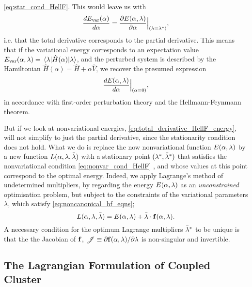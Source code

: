 \autoref{eq:stat_cond_HellF}. This would leave us with 
\begin{equation}
    \frac{d E_{\text{var}}(\alpha)}{d\alpha} 
    = \frac{\partial E(\alpha, \vb{\lambda})}{\partial\alpha}\Big\lvert_{(\vb{\lambda} = \vb{\lambda}^*)},
\end{equation}
i.e. that the total derivative corresponds to the partial derivative. This means that if the variational 
energy corresponds to an expectation value 
$E_{\text{var}}(\alpha, \vb{\lambda}) = \mel{\vb{\lambda}}{\hat{H}(\alpha)}{\vb{\lambda}}$, and the 
perturbed system is described by the Hamiltonian $\hat{H}(\alpha) = \hat{H} + \alpha\hat{V}$, we 
recover the presumed expression
\begin{equation}
\frac{dE(\alpha, \vb{\lambda})}{d\alpha}\Big\lvert_{(\alpha = 0)},
\end{equation}
in accordance with first-order perturbation theory and the Hellmann-Feynmann theorem.

But if we look at nonvariational energies, \autoref{eq:total_derivative_HellF_energy},
will not simplify to just the partial derivative, since the stationarity condition does not hold. 
What we do is replace the now nonvariational function $E(\alpha, \vb{\lambda})$ by a new function 
$L(\alpha, \vb{\lambda}, \bar{\vb{\lambda}})$ with a stationary point 
$(\vb{\lambda}^*, \bar{\vb{\lambda}}^*)$ that satisfies the nonvariational condition
\autoref{eq:nonvar_cond_HellF}
, and whose values at this point correspond to the optimal
energy. Indeed, we apply Lagrange's method of undetermined multipliers, by regarding the 
energy $E(\alpha, \vb{\lambda})$ as an \emph{unconstrained} optimisation problem, but 
subject to the constraints of the variational parameters $\lambda$, which satisfy
\autoref{eq:noncanonical_hf_eqns};
\begin{equation}
    \label{eq:langrange_method}
    L(\alpha, \vb{\lambda}, \bar{\vb{\lambda}})
    = E(\alpha, \vb{\lambda}) + \bar{\vb{\lambda}} \cdot \vb{f}(\alpha, \vb{\lambda}).
\end{equation}
A necessary condition for the optimum Lagrange multipliers $\bar{\vb{\lambda}}^*$ to 
be unique is that the the Jacobian of $\vb{f}$, 
$\mathscr{J} \equiv \partial \vb{f}(\alpha, \vb{\lambda})/\partial \lambda$ is non-singular 
and invertible.

\subsection{The Lagrangian Formulation of Coupled Cluster}


